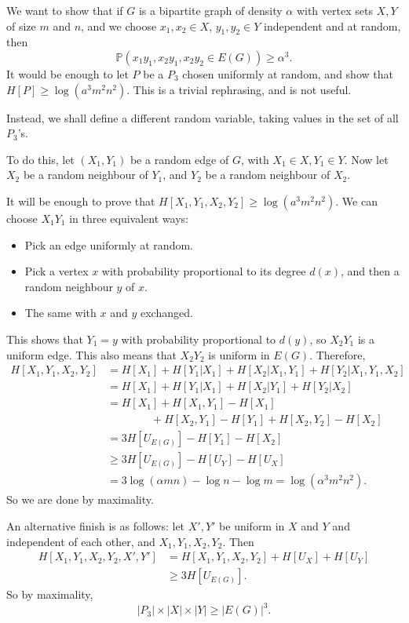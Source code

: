 \documentclass[12pt]{article}
\begin{document}
\begin{proofbox}
	We want to show that if $G$ is a bipartite graph of density $\alpha$ with vertex sets $X, Y$ of size $m$ and $n$, and we choose $x_1, x_2 \in X$, $y_1, y_2 \in Y$ independent and at random, then
	\[
		\mathbb{P}(x_1 y_1, x_2y_1, x_2y_2 \in E(G)) \geq \alpha^3.
	\]
	It would be enough to let $P$ be a $P_3$ chosen uniformly at random, and show that $H[P] \geq \log (a^3 m^2 n^2)$. This is a trivial rephrasing, and is not useful.

	Instead, we shall define a different random variable, taking values in the set of all $P_3$'s. 

	To do this, let $(X_1, Y_1)$ be a random edge of $G$, with $X_1 \in X, Y_1 \in Y$. Now let $X_2$ be a random neighbour of $Y_1$, and $Y_2$ be a random neighbour of $X_2$.

	It will be enough to prove that $H[X_1, Y_1, X_2, Y_2] \geq \log(a^3 m^2 n^2)$.
	We can choose $X_1 Y_1$ in three equivalent ways:
	\begin{itemize}
		\item Pick an edge uniformly at random.
		\item Pick a vertex $x$ with probability proportional to its degree $d(x)$, and then a random neighbour $y$ of $x$.
		\item The same with $x$ and $y$ exchanged.
	\end{itemize}
	This shows that $Y_1 = y$ with probability proportional to $d(y)$, so $X_2 Y_1$ is a uniform edge. This also means that $X_2 Y_2$ is uniform in $E(G)$. Therefore,
	\begin{align*}
		H[X_1, Y_1, X_2, Y_2] &= H[X_1] + H[Y_1|X_1] + H[X_2|X_1,Y_1] + H[Y_2|X_1,Y_1,X_2] \\
				      &= H[X_1] + H[Y_1|X_1] + H[X_2|Y_1] + H[Y_2|X_2] \\
				      &= H[X_1] + H[X_1, Y_1] - H[X_1] \\
				      & \qquad \qquad + H[X_2, Y_1] - H[Y_1] + H[X_2,Y_2] - H[X_2] \\
				      &= 3 H[U_{E(G)}] - H[Y_1] - H[X_2] \\
				      &\geq 3H[U_{E(G)}] - H[U_Y] - H[U_X] \\
				      &= 3 \log (\alpha mn) - \log n - \log m = \log(\alpha^3 m^2 n^2).
	\end{align*}
	So we are done by maximality.

	An alternative finish is as follows: let $X', Y'$ be uniform in $X$ and $Y$ and independent of each other, and $X_1, Y_1, X_2, Y_2$. Then
	\begin{align*}
		H[X_1,Y_1,X_2,Y_2,X',Y'] &= H[X_1, Y_1, X_2, Y_2] + H[U_X] + H[U_Y] \\
					 &\geq 3 H[U_{E(G)}].
	\end{align*}
	So by maximality,
	\[
	|P_3| \times |X| \times |Y| \geq |E(G)|^3.
	\]
\end{proofbox}
\end{document}
